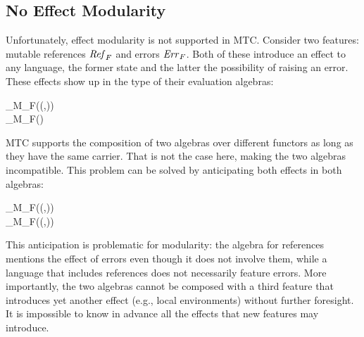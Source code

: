 


\subsection{No Effect Modularity}\label{s:mtc:problem}



Unfortunately, effect modularity is not supported in MTC. Consider
two features: mutable references \ensuremath{\Varid{Ref}_F} and errors \ensuremath{\Varid{Err}_F}. Both of
these introduce an effect to any language, the former state and the
latter the possibility of raising an error. These effects show up
in the type of their evaluation algebras:
\begin{hscode}\SaveRestoreHook
{}%
%
%
\>[3]{}\mathbin{::}_M\;_F\;(\to (,)){}\<[E]%
\\
\>[3]{}\mathbin{::}_M\;_F\;(\;){}\<[E]%
\ColumnHook
\end{hscode}\resethooks
MTC supports the composition of two algebras over different functors as long as
they have the same carrier. That is not the case here, making the two algebras
incompatible. This problem can be solved by anticipating both effects in both
algebras:
\begin{hscode}\SaveRestoreHook
{}%
%
%
\>[3]{}\mathbin{::}_M\;_F\;(\to (\;,)){}\<[E]%
\\
\>[3]{}\mathbin{::}_M\;_F\;(\to (\;,)){}\<[E]%
\ColumnHook
\end{hscode}\resethooks
This anticipation is problematic for modularity: the algebra
for references mentions the effect of errors even though it does not involve
them, while a language that includes references does not necessarily
feature errors.  More importantly, the two algebras cannot be
composed with a third feature that introduces yet another effect
(e.g., local environments) without further foresight. It is
impossible to know in advance all the effects that new
features may introduce.
